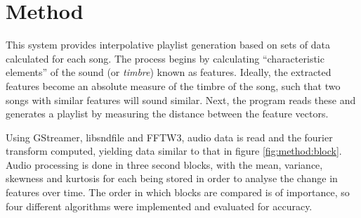 \section{Method}
This system provides interpolative playlist generation based on sets of data calculated for each song. The process begins by calculating ``characteristic elements'' \citep{Fingerhut2004} of the sound (or \emph{timbre}) known as features. Ideally, the extracted features become an absolute measure of the timbre of the song, such that two songs with similar features will sound similar. Next, the program reads these and generates a playlist by measuring the distance between the feature vectors.

Using GStreamer, libsndfile and FFTW3, audio data is read and the fourier transform computed, yielding data similar to that in figure \ref{fig:method:block}. Audio processing is done in three second blocks, with the mean, variance, skewness and kurtosis for each being stored in order to analyse the change in features over time. The order in which blocks are compared is of importance, so four different algorithms were implemented and evaluated for accuracy.

